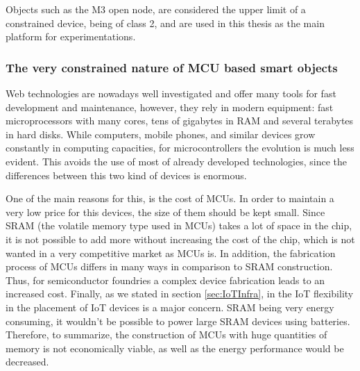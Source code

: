 Objects such as the M3 open node, are considered the upper limit of a constrained device, being of class 2, and are used in this thesis as the main platform for experimentations.

\subsubsection{The very constrained nature of MCU based smart objects}
Web technologies are nowadays well investigated and offer many tools for fast development and maintenance, however, they rely in modern equipment: fast microprocessors with many cores, tens of gigabytes in RAM and several terabytes in hard disks.
While computers, mobile phones, and similar devices grow constantly in computing capacities, for microcontrollers the evolution is much less evident.
This avoids the use of most of already developed technologies, since the differences between this two kind of devices is enormous.

One of the main reasons for this, is the cost of MCUs.
In order to maintain a very low price for this devices, the size of them should be kept small.
Since SRAM (the volatile memory type used in MCUs) takes a lot of space in the chip, it is not possible to add more without increasing the cost of the chip, which is not wanted in a very competitive market as MCUs is.
In addition, the fabrication process of MCUs differs in many ways in comparison to SRAM construction.
Thus, for semiconductor foundries a complex device fabrication leads to an increased cost.
Finally, as we stated in section \ref{sec:IoTInfra}, in the IoT flexibility in the placement of IoT devices is a major concern.
SRAM being very energy consuming, it wouldn't be possible to power large SRAM devices using batteries.
Therefore, to summarize, the construction of MCUs with huge quantities of memory is not economically viable, as well as the energy performance would be decreased.

